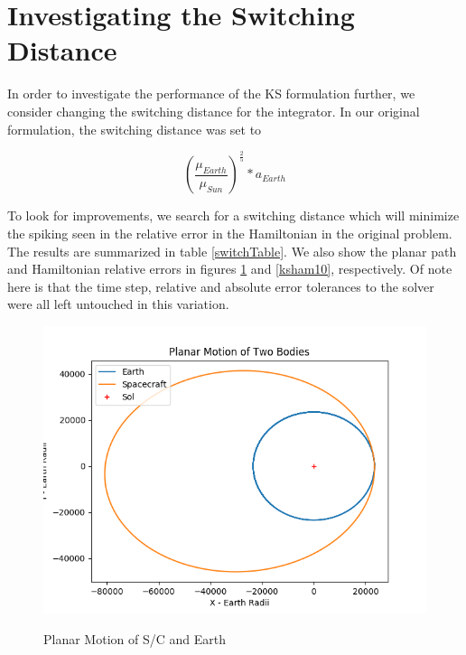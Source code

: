 \documentclass[11pt,twoside,letterpaper]{article}
\begin{document}
  
  \section{Investigating the Switching Distance}
  In order to investigate the performance of the KS formulation
  further, we consider changing the switching distance for the
  integrator. In our original formulation, the switching distance was
  set to
  
  \begin{equation}
    \left(\frac{\mu_{Earth}}{\mu_{Sun}}\right)^{\frac{2}{5}}*a_{Earth}
  \end{equation}
  
  To look for improvements, we search for a switching distance which
  will minimize the spiking seen in the relative error in the
  Hamiltonian in the original problem. The results are summarized in
  table \ref{switchTable}. We also show the planar path and
  Hamiltonian relative errors in figures \ref{kspath10} and
  \ref{ksham10}, respectively. Of note here is that the time step,
  relative and absolute error tolerances to the solver were all left
  untouched in this variation. 

  \begin{figure}
    \caption{Planar Motion of S/C and Earth}
    \centering
    \includegraphics[scale=0.5]{PlanarPath}
    \label{kspath10}
  \end{figure}
\end{document}
